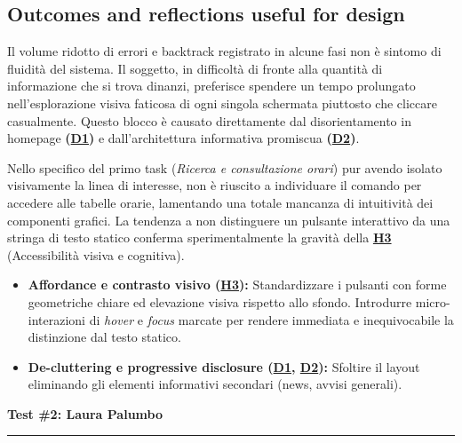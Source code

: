 ﻿\documentclass[11pt,a4paper]{article}
\begin{document}
\subsection*{Outcomes and reflections useful for design}
\begin{tcolorbox}[base]
Il volume ridotto di errori e backtrack registrato in alcune fasi non è sintomo di fluidità del sistema. Il soggetto, in difficoltà di fronte alla quantità di informazione che si trova dinanzi, preferisce spendere un tempo prolungato nell'esplorazione visiva faticosa di ogni singola schermata piuttosto che cliccare casualmente. Questo blocco è causato direttamente dal disorientamento in homepage \textbf{(\hyperref[iss:D1]{D1})} e dall'architettura informativa promiscua \textbf{(\hyperref[iss:D2]{D2})}.

Nello specifico del primo task (\textit{Ricerca e consultazione orari}) pur avendo isolato visivamente la linea di interesse, non è riuscito a individuare il comando per accedere alle tabelle orarie, lamentando una totale mancanza di intuitività dei componenti grafici.
La tendenza a non distinguere un pulsante interattivo da una stringa di testo statico conferma sperimentalmente la gravità della \textbf{\hyperref[iss:H3]{H3}} (Accessibilità visiva e cognitiva). 

\begin{itemize}[leftmargin=*]
    \item \textbf{Affordance e contrasto visivo (\hyperref[iss:H3]{H3}):} Standardizzare i pulsanti con forme geometriche chiare ed elevazione visiva rispetto allo sfondo. Introdurre micro-interazioni di \textit{hover} e \textit{focus} marcate per rendere immediata e inequivocabile la distinzione dal testo statico.
    \item \textbf{De-cluttering e progressive disclosure (\hyperref[iss:D1]{D1}, \hyperref[iss:D2]{D2}):} Sfoltire il layout eliminando gli elementi informativi secondari (news, avvisi generali).
\end{itemize}
\end{tcolorbox}


\newpage
\begin{center}
  {\color{primaryColor}\large\bfseries Test \#2: Laura Palumbo}\\
  \vspace{0.1cm}
  \color{borderColor}\hrule
\end{center}
\end{document}
